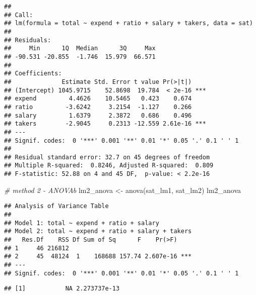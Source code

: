 \documentclass[
]{article}
\newenvironment{Shaded}{\begin{snugshade}}{\end{snugshade}}
\newcommand{\AttributeTok}[1]{\textcolor[rgb]{0.77,0.63,0.00}{#1}}
\newcommand{\CommentTok}[1]{\textcolor[rgb]{0.56,0.35,0.01}{\textit{#1}}}
\newcommand{\DecValTok}[1]{\textcolor[rgb]{0.00,0.00,0.81}{#1}}
\newcommand{\FunctionTok}[1]{\textcolor[rgb]{0.00,0.00,0.00}{#1}}
\newcommand{\NormalTok}[1]{#1}
\newcommand{\OtherTok}[1]{\textcolor[rgb]{0.56,0.35,0.01}{#1}}
\newcommand{\SpecialCharTok}[1]{\textcolor[rgb]{0.00,0.00,0.00}{#1}}
\newcommand{\StringTok}[1]{\textcolor[rgb]{0.31,0.60,0.02}{#1}}
\begin{document}
\begin{verbatim}
## 
## Call:
## lm(formula = total ~ expend + ratio + salary + takers, data = sat)
## 
## Residuals:
##     Min      1Q  Median      3Q     Max 
## -90.531 -20.855  -1.746  15.979  66.571 
## 
## Coefficients:
##              Estimate Std. Error t value Pr(>|t|)    
## (Intercept) 1045.9715    52.8698  19.784  < 2e-16 ***
## expend         4.4626    10.5465   0.423    0.674    
## ratio         -3.6242     3.2154  -1.127    0.266    
## salary         1.6379     2.3872   0.686    0.496    
## takers        -2.9045     0.2313 -12.559 2.61e-16 ***
## ---
## Signif. codes:  0 '***' 0.001 '**' 0.01 '*' 0.05 '.' 0.1 ' ' 1
## 
## Residual standard error: 32.7 on 45 degrees of freedom
## Multiple R-squared:  0.8246, Adjusted R-squared:  0.809 
## F-statistic: 52.88 on 4 and 45 DF,  p-value: < 2.2e-16
\end{verbatim}

\begin{Shaded}
\begin{Highlighting}[]
\CommentTok{\# method 2 {-} ANOVAb}
\NormalTok{lm2\_anova }\OtherTok{\textless{}{-}} \FunctionTok{anova}\NormalTok{(sat\_lm1, sat\_lm2)}
\NormalTok{lm2\_anova}
\end{Highlighting}
\end{Shaded}

\begin{verbatim}
## Analysis of Variance Table
## 
## Model 1: total ~ expend + ratio + salary
## Model 2: total ~ expend + ratio + salary + takers
##   Res.Df    RSS Df Sum of Sq      F    Pr(>F)    
## 1     46 216812                                  
## 2     45  48124  1    168688 157.74 2.607e-16 ***
## ---
## Signif. codes:  0 '***' 0.001 '**' 0.01 '*' 0.05 '.' 0.1 ' ' 1
\end{verbatim}

\begin{Shaded}
\end{Shaded}

\begin{verbatim}
## [1]           NA 2.273737e-13
\end{verbatim}
\end{document}
